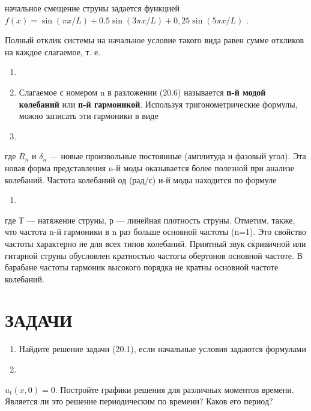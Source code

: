 \documentclass[
  ukrainian,
]{article}
\providecommand{\tightlist}{%
  \setlength{\itemsep}{0pt}\setlength{\parskip}{0pt}}
\begin{document}
начальное смещение струны задается функцией
\(f(x) = \sin(\pi x/L) + 0.5 \sin(3\pi x/ L) + 0,25 \sin(5\pi x/L)\) .

Полный отклик системы на начальное условие такого вида равен сумме
откликов на каждое слагаемое, т. е.

\begin{enumerate}
\def\labelenumi{\arabic{enumi}.}
\setcounter{enumi}{17}
\item
\item
  Слагаемое с номером n в разложении (20.6) называется \textbf{п-й модой
  колебаний} или \textbf{п-й гармоникой}. Используя тригонометрические
  формулы, можно записать эти гармоники в виде
\item
\end{enumerate}

где \(R_n\) и \(\delta_n\) --- новые произвольные постоянные (амплитуда
и фазовый угол). Эта новая форма представления n-й моды оказывается
более полезной при анализе колебаний. Частота колебаний од (рад/с) и-й
моды находится по формуле

\begin{enumerate}
\def\labelenumi{\arabic{enumi}.}
\setcounter{enumi}{9}
\tightlist
\item
\end{enumerate}

где Т --- натяжение струны, р --- линейная плотность струны. Отметим,
также, что частота n-й гармоники в n раз больше основной частоты (n=1).
Это свойство частоты характерно не для всех типов колебаний. Приятный
звук скривичной или гитарной струны обусловлен кратностью частогы
обертонов основной частоте. В барабане частоты гармоник высокого порядка
не кратны основной частоте колебаний.

\section{ЗАДАЧИ}\label{ux437ux430ux434ux430ux447ux438-7}

\begin{enumerate}
\def\labelenumi{\arabic{enumi}.}
\item
  Найдите решение задачи (20.1), если начальные условия задаются
  формулами
\item
\end{enumerate}

\(u_t(x, 0) = 0.\) Постройте графики решения для различных моментов
времени. Является ли это решение периодическим по времени? Каков его
период?
\end{document}
